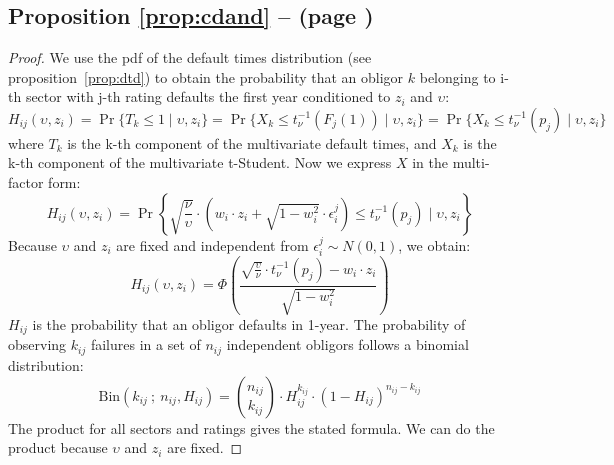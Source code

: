 \documentclass[11pt,fleqn]{book} %
\begin{document}
\section{}

\subsection{Proposition \ref{prop:cdand} --  (page \pageref{prop:cdand})}
\begin{proof}
	We use the pdf of the default times distribution (see proposition~\ref{prop:dtd}) 
	to obtain the probability that an obligor $k$ belonging to i-th sector with j-th 
	rating defaults the first year conditioned to $z_i$ and $\upsilon$:
	\begin{displaymath}
		H_{ij}(\upsilon,z_i) = 
		\Pr\{T_k \le 1 \mid \upsilon, z_i\} = 
		\Pr\{ X_k \le t_{\nu}^{-1}(F_j(1)) \mid \upsilon, z_i\} = 
		\Pr\{ X_k \le t_{\nu}^{-1}(p_j) \mid \upsilon, z_i\}
	\end{displaymath}
	where $T_k$ is the k-th component of the multivariate default times, 
	and $X_k$ is the k-th component of the multivariate t-Student. 
	Now we express $X$ in the multi-factor form:
	\begin{displaymath}
		H_{ij}(\upsilon,z_i) = \Pr \left\{ 
		\sqrt{\frac{\nu}{\upsilon}} \cdot \left( w_i \cdot z_i + \sqrt{1-w_i^2} \cdot \epsilon_i^j\right)
		\le t_{\nu}^{-1}(p_j) \mid \upsilon, z_i
		\right\}
	\end{displaymath}
	Because $\upsilon$ and $z_i$ are fixed and independent from $\epsilon_i^j \sim N(0,1)$, we obtain:
	\begin{displaymath}
		H_{ij}(\upsilon,z_i) = \Phi\left(  
		\frac{\sqrt{\frac{\upsilon}{\nu}} \cdot t_{\nu}^{-1}(p_j) - w_i\cdot z_i}{\sqrt{1-w_i^2}}
		\right)
	\end{displaymath}
	$H_{ij}$ is the probability that an obligor defaults in 1-year. The 
	probability of observing $k_{ij}$ failures in a set of $n_{ij}$ independent
	obligors follows a binomial distribution:
	\begin{displaymath}
		\text{Bin}(k_{ij}\ ;\ n_{ij},H_{ij}) = 
		\binom{n_{ij}}{k_{ij}} \cdot H_{ij}^{k_{ij}} \cdot (1-H_{ij})^{n_{ij}-k_{ij}}
	\end{displaymath}
	The product for all sectors and ratings gives the stated formula. 
	We can do the product because $\upsilon$ and $z_i$ are fixed.
\end{proof}






\end{document}
